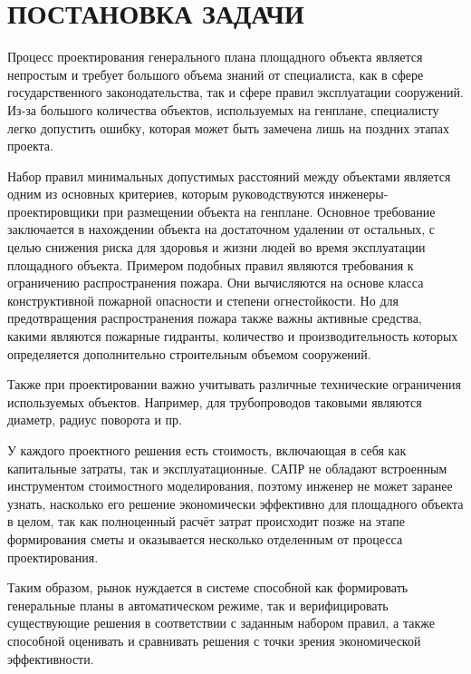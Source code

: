 \section*{\hfill\Large{ПОСТАНОВКА ЗАДАЧИ}\hfill}


Процесс проектирования генерального плана площадного объекта является непростым
и требует большого объема знаний от специалиста, как в сфере государственного законодательства,
так и сфере правил эксплуатации сооружений.
Из-за большого количества объектов, используемых на генплане, специалисту легко допустить ошибку,
которая может быть замечена лишь на поздних этапах проекта.

Набор правил минимальных допустимых расстояний между объектами является одним из основных критериев,
которым руководствуются инженеры-проектировщики при размещении объекта на генплане.
Основное требование заключается в нахождении объекта на достаточном удалении от остальных,
с целью снижения риска для здоровья и жизни людей во время эксплуатации площадного объекта.
Примером подобных правил являются
требования к ограничению распространения пожара\cite{Fire}.
Они вычисляются на основе класса конструктивной пожарной опасности и степени огнестойкости.
Но для предотвращения распространения пожара также важны
активные средства, какими являются пожарные гидранты, количество и производительность которых определяется
дополнительно строительным объемом сооружений.

Также при проектировании важно учитывать различные технические ограничения используемых объектов.
Например, для трубопроводов таковыми являются диаметр, радиус поворота и пр.

У каждого проектного решения есть стоимость, включающая в себя как капитальные затраты, так и эксплуатационные.
САПР не обладают встроенным инструментом стоимостного моделирования,
поэтому инженер не может заранее узнать,
насколько его решение экономически эффективно для площадного объекта в целом,
так как полноценный расчёт затрат происходит позже на этапе формирования сметы
и оказывается несколько отделенным от процесса проектирования.

Таким образом, рынок нуждается в системе способной как формировать генеральные планы в автоматическом режиме,
так и верифицировать существующие решения в соответствии с заданным набором правил,
а также способной оценивать и сравнивать решения с точки зрения экономической эффективности.


